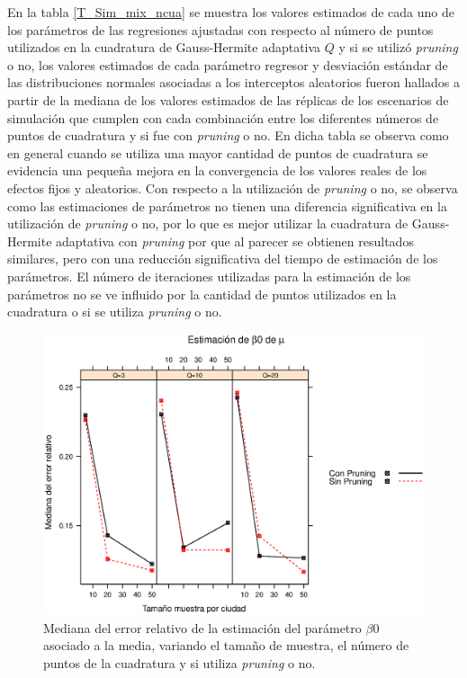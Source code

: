 En la tabla \ref{T_Sim_mix_ncua} se muestra los valores estimados de cada uno de los par\'{a}metros de las regresiones ajustadas con respecto al n\'{u}mero de puntos utilizados en la cuadratura de Gauss-Hermite adaptativa $Q$ y si se utiliz\'{o} \textit{pruning} o no, los valores estimados de cada par\'{a}metro regresor y desviaci\'{o}n est\'{a}ndar de las distribuciones normales asociadas a los interceptos aleatorios fueron hallados a partir de la mediana de los valores estimados de las r\'{e}plicas de los escenarios de simulaci\'{o}n que cumplen con cada combinaci\'{o}n entre los diferentes n\'{u}meros de puntos de cuadratura y si fue con \textit{pruning} o no. En dicha tabla se observa como en general cuando se utiliza una mayor cantidad de puntos de cuadratura se evidencia una peque\~{n}a mejora en la convergencia de los valores reales de los efectos fijos y aleatorios. Con respecto a la utilizaci\'{o}n de \textit{pruning} o no, se observa como las estimaciones de par\'{a}metros no tienen una diferencia significativa en la utilizaci\'{o}n de \textit{pruning} o no, por lo que es mejor utilizar la cuadratura de Gauss-Hermite adaptativa con \textit{pruning} por que al parecer se obtienen resultados similares, pero con una reducci\'{o}n significativa del tiempo de estimaci\'{o}n de los par\'{a}metros. El n\'{u}mero de iteraciones utilizadas para la estimaci\'{o}n de los par\'{a}metros no se ve influido por la cantidad de puntos utilizados en la cuadratura o si se utiliza \textit{pruning} o no.\\

\begin{figure}
	\begin{center}
		\includegraphics[scale=0.6]{MAPE_beta0_mu.eps}	
		\caption{Mediana del error relativo de la estimaci\'{o}n del par\'{a}metro $\beta0$ asociado a la media, variando el tama\~{n}o de muestra, el n\'{u}mero de puntos de la cuadratura y si utiliza \textit{pruning} o no.}
		\label{MAPE_bo_mu}
	\end{center}
\end{figure}

